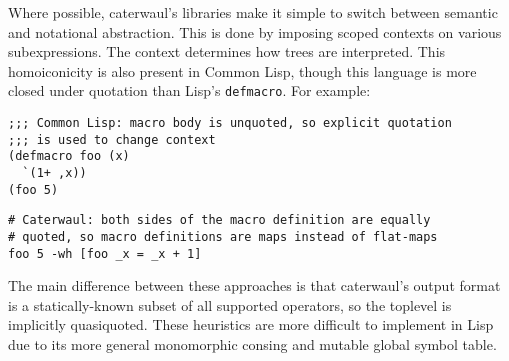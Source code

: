 \documentclass{report}
\begin{document}
  Where possible, caterwaul's libraries make it simple to switch between semantic and notational abstraction. This is done by imposing scoped contexts on various subexpressions. The context
  determines how trees are interpreted. This homoiconicity is also present in Common Lisp, though this language is more closed under quotation than Lisp's {\tt defmacro}. For example:

\begin{verbatim}
;;; Common Lisp: macro body is unquoted, so explicit quotation
;;; is used to change context
(defmacro foo (x)
  `(1+ ,x))
(foo 5)
\end{verbatim}

\begin{verbatim}
# Caterwaul: both sides of the macro definition are equally
# quoted, so macro definitions are maps instead of flat-maps
foo 5 -wh [foo _x = _x + 1]
\end{verbatim}

  The main difference between these approaches is that caterwaul's output format is a statically-known subset of all supported operators, so the toplevel is implicitly quasiquoted. These
  heuristics are more difficult to implement in Lisp due to its more general monomorphic consing and mutable global symbol table.
\end{document}
